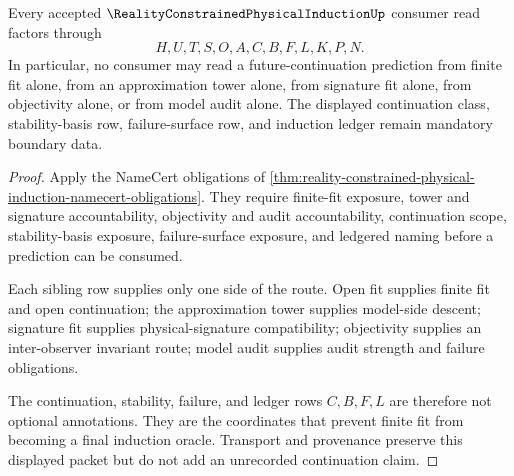 \begin{theorem}
\label{thm:reality-constrained-physical-induction-nonescape}
Every accepted $\RealityConstrainedPhysicalInductionUp$ consumer read factors through
$$
H,U,T,S,O,A,C,B,F,L,K,P,N.
$$
In particular, no consumer may read a future-continuation prediction from finite fit alone, from an approximation tower alone, from signature fit alone, from objectivity alone, or from model audit alone. The displayed continuation class, stability-basis row, failure-surface row, and induction ledger remain mandatory boundary data.
\end{theorem}
\begin{proof}
Apply the NameCert obligations of \autoref{thm:reality-constrained-physical-induction-namecert-obligations}. They require finite-fit exposure, tower and signature accountability, objectivity and audit accountability, continuation scope, stability-basis exposure, failure-surface exposure, and ledgered naming before a prediction can be consumed.

Each sibling row supplies only one side of the route. Open fit supplies finite fit and open continuation; the approximation tower supplies model-side descent; signature fit supplies physical-signature compatibility; objectivity supplies an inter-observer invariant route; model audit supplies audit strength and failure obligations.

The continuation, stability, failure, and ledger rows $C,B,F,L$ are therefore not optional annotations. They are the coordinates that prevent finite fit from becoming a final induction oracle. Transport and provenance preserve this displayed packet but do not add an unrecorded continuation claim.
\end{proof}

